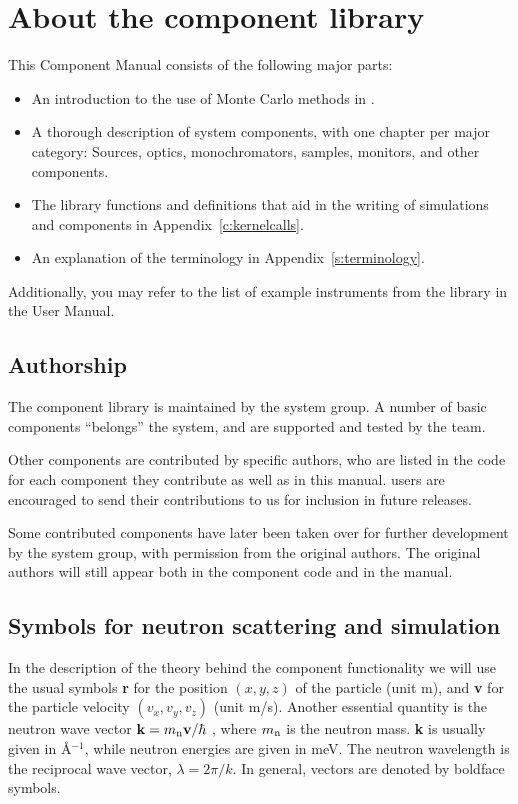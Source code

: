 
\chapter{About the component library}
\label{c:components}
This \MCS Component Manual consists of the following major parts:
\begin{itemize}
\item An introduction to the use of Monte Carlo methods in \MCS .
\item A thorough description of system components,
with one chapter per major category: Sources, optics,
monochromators, samples, monitors, and other components.
\item The \MCS library functions and definitions
  that aid in the writing of simulations and components in
  Appendix~\ref{c:kernelcalls}.
\item An explanation of the \MCS terminology in Appendix~\ref{s:terminology}.
\end{itemize}
Additionally, you may refer to the list of example instruments
from the library in the \MCS User Manual.

\section{Authorship}
The component library is
maintained by the \MCS system group. A number of basic components
``belongs'' the \MCS system, and are supported and tested by the \MCS
team.

Other components are contributed
by specific authors, who are listed in the code for each component
they contribute as well as in this manual.
\MCS users are encouraged to send their
contributions to us for inclusion in future releases.

Some contributed components have later been taken over
for further development by the \MCS system
group, with permission from the original authors.
The original authors will still appear both in the component code and in the
\MCS manual.

\section{Symbols for neutron scattering and simulation}
In the description of the theory behind the component functionality
we will use the usual symbols {\bf r} for the position
$(x,y,z)$ of the particle (unit m), and {\bf v} for
the particle velocity $(v_x, v_y, v_z)$ (unit m/s).
Another essential quantity is the neutron wave vector
${\bf k} = m_{\rm n} {\bf v}/\hbar$ , where
$m_{\rm n}$ is the neutron mass. {\bf k} is usually given in
\AA$^{-1}$, while neutron energies are given in meV.
The neutron wavelength is the reciprocal wave vector,
$\lambda=2 \pi / k$.
In general, vectors are denoted by boldface symbols.

